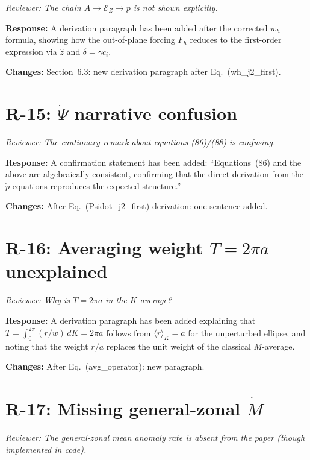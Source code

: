 \documentclass[11pt]{article}
\newcommand{\rev}[1]{\textcolor{revcolor}{\emph{#1}}}
\begin{document}
\rev{Reviewer: The chain $A \to \mathcal{E}_Z \to \dot{p}$ is not shown
explicitly.}

\textbf{Response:} A derivation paragraph has been added after the corrected
$w_h$ formula, showing how the out-of-plane forcing $F_h$ reduces to the
first-order expression via $\hat z$ and $\delta = \gamma c_i$.

\textbf{Changes:} Section~6.3: new derivation paragraph after
Eq.~(wh\_j2\_first).

\section*{R-15: $\dot\Psi$ narrative confusion}

\rev{Reviewer: The cautionary remark about equations (86)/(88) is confusing.}

\textbf{Response:} A confirmation statement has been added: ``Equations~(86)
and the above are algebraically consistent, confirming that the direct
derivation from the $\dot p$ equations reproduces the expected structure.''

\textbf{Changes:} After Eq.~(Psidot\_j2\_first) derivation: one sentence
added.

\section*{R-16: Averaging weight $T = 2\pi a$ unexplained}

\rev{Reviewer: Why is $T = 2\pi a$ in the $K$-average?}

\textbf{Response:} A derivation paragraph has been added explaining that
$T = \int_0^{2\pi}(r/w)\,dK = 2\pi a$ follows from $\langle r \rangle_K = a$
for the unperturbed ellipse, and noting that the weight $r/a$ replaces the
unit weight of the classical $M$-average.

\textbf{Changes:} After Eq.~(avg\_operator): new paragraph.

\section*{R-17: Missing general-zonal $\dot{\bar M}$}

\rev{Reviewer: The general-zonal mean anomaly rate is absent from the paper
(though implemented in code).}
\end{document}
